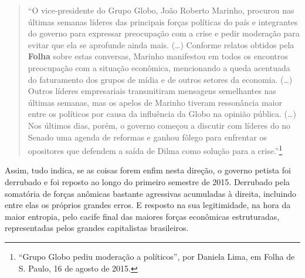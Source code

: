 \begin{quote}
``O vice-presidente do Grupo Globo, João Roberto Marinho, procurou nas
últimas semanas líderes das principais forças políticas do país e
integrantes do governo para expressar preocupação com a crise e pedir
moderação para evitar que ela se aprofunde ainda mais. (…) Conforme
relatos obtidos pela \textbf{Folha} sobre estas conversas, Marinho
manifestou em todos os encontros preocupação com a situação econômica,
mencionando a queda acentuada do faturamento dos grupos de mídia e de
outros setores da economia. (…) Outros líderes empresariais
transmitiram mensagens semelhantes nas últimas semanas, mas os apelos de
Marinho tiveram ressonância maior entre os políticos por causa da
influência da Globo na opinião pública. (…) Nos últimos dias, porém, o
governo começou a discutir com líderes do  no Senado uma agenda de
reformas e ganhou fôlego para enfrentar os opositores que defendem a
saída de Dilma como solução para a crise.''\footnote{``Grupo Globo pediu
  moderação a políticos'', por Daniela Lima, em Folha de S. Paulo, 16 de
  agosto de 2015.}
\end{quote}

Assim, tudo indica, se as coisas forem enfim nesta direção, o governo
petista foi derrubado e foi reposto ao longo do primeiro semestre de
2015. Derrubado pela somatória de forças anômicas bastante agressivas
acumuladas à direita, incluindo entre elas os próprios grandes erros. E
resposto na sua legitimidade, na hora da maior entropia, pelo cacife
final das maiores forças econômicas estruturadas, representadas pelos
grandes capitalistas brasileiros.

